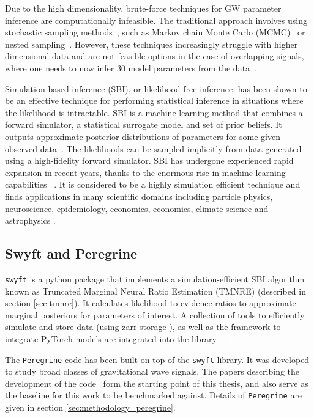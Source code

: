 Due to the high dimensionality, brute-force techniques for GW parameter inference are computationally infeasible. The traditional approach involves using stochastic sampling methods~\cite{Thrane_Talbot_2019}, such as Markov chain Monte Carlo (MCMC)~\cite{Metropolis_1953,Hastings_1970} or nested sampling~\cite{Skilling_2004}. However, these techniques increasingly struggle with higher dimensional data and are not feasible options in the case of overlapping signals, where one needs to now infer 30 model parameters from the data~\cite{alvey2023things}.

Simulation-based inference (SBI), or likelihood-free inference, has been shown to be an effective technique for performing statistical inference in situations where the likelihood is intractable. SBI is a machine-learning method that combines a forward simulator, a statistical surrogate model and set of prior beliefs. It outputs approximate posterior distributions of parameters for some given observed data~\cite{Miller2022}. The likelihoods can be sampled implicitly from data generated using a high-fidelity forward simulator. SBI has undergone experienced rapid expansion in recent years, thanks to the enormous rise in machine learning capabilities~ \cite{Cranmer_SBI_2020}. It is considered to be a highly simulation efficient technique and finds applications in many scientific domains including particle physics, neuroscience, epidemiology, economics, economics, climate science and astrophysics \cite{Cranmer_SBI_2020}.

\subsection{Swyft and Peregrine}

\texttt{swyft} is a python package that implements a simulation-efficient SBI algorithm known as Truncated Marginal Neural Ratio Estimation (TMNRE) (described in section \ref{sec:tmnre}). It calculates likelihood-to-evidence ratios to approximate marginal posteriors for parameters of interest. A collection of tools to efficiently simulate and store data (using zarr storage \cite{Miles_zarr_2021}), as well as the framework to integrate PyTorch models are integrated into the library ~\cite{Miller_TMNRE_2021}.

The \texttt{Peregrine} code has been built on-top of the \texttt{swyft} library. It was developed to study broad classes of gravitational wave signals. The papers describing the development of the code~\cite{bhardwaj2023peregrine,alvey2023things} form the starting point of this thesis, and also serve as the baseline for this work to be benchmarked against. Details of \texttt{Peregrine} are given in section \ref{sec:methodology_peregrine}.

